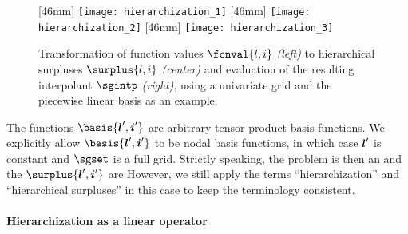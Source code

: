 \begin{figure}
  [46mm]{%
    \texttt{[image: hierarchization\_1]}%
  }%
  \hfill%
  [46mm]{%
    \texttt{[image: hierarchization\_2]}%
  }%
  \hfill%
  [46mm]{%
    \texttt{[image: hierarchization\_3]}%
  }%
  \caption[%
    Hierarchization of function values and evaluation of interpolant%
  ]{%
    Transformation of function values $\fcnval{l,i}$ \emph{(left)}
    to hierarchical surpluses $\surplus{l,i}$ \emph{(center)} and
    evaluation of the resulting interpolant $\sgintp$ \emph{(right)},
    using a univariate grid and the piecewise linear basis as an example.%
  }%
  \label{fig:hierarchization}%
\end{figure}

The functions $\basis{\*l',\*i'}$ are
arbitrary tensor product basis functions.
We explicitly allow $\basis{\*l',\*i'}$ to be nodal basis functions,
in which case ${\boldsymbol{l}}'$ is constant and
$\sgset$ is a full grid.
Strictly speaking, the problem is then an 
and the $\surplus{\*l',\*i'}$ are 
However, we still apply the terms
``hierarchization'' and ``hierarchical surpluses'' in this case
to keep the terminology consistent.

\paragraph{Hierarchization as a linear operator}

